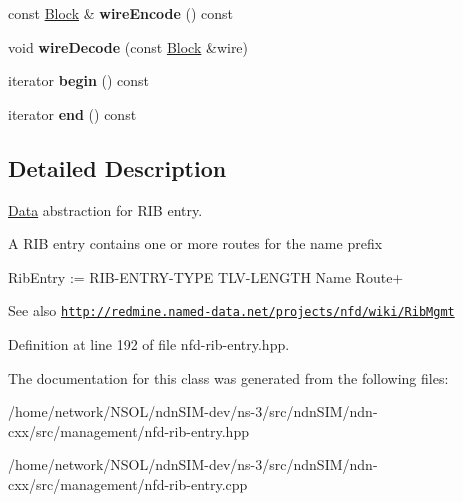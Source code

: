 \begin{DoxyCompactItemize}
\item 
const \hyperlink{classndn_1_1Block}{Block} \& {\bfseries wire\+Encode} () const\hypertarget{classndn_1_1nfd_1_1RibEntry_ae9a113819d406caa92be70ee3f6cfd0d}{}\label{classndn_1_1nfd_1_1RibEntry_ae9a113819d406caa92be70ee3f6cfd0d}

\item 
void {\bfseries wire\+Decode} (const \hyperlink{classndn_1_1Block}{Block} \&wire)\hypertarget{classndn_1_1nfd_1_1RibEntry_a7a621fa190ab527bd4699d81e52bb100}{}\label{classndn_1_1nfd_1_1RibEntry_a7a621fa190ab527bd4699d81e52bb100}

\item 
iterator {\bfseries begin} () const\hypertarget{classndn_1_1nfd_1_1RibEntry_ada9a2987ccbebd98ec88cfecad89064c}{}\label{classndn_1_1nfd_1_1RibEntry_ada9a2987ccbebd98ec88cfecad89064c}

\item 
iterator {\bfseries end} () const\hypertarget{classndn_1_1nfd_1_1RibEntry_a6ee2f83aad4acc89c601218f4d851661}{}\label{classndn_1_1nfd_1_1RibEntry_a6ee2f83aad4acc89c601218f4d851661}

\end{DoxyCompactItemize}


\subsection{Detailed Description}
\hyperlink{classndn_1_1Data}{Data} abstraction for R\+IB entry. 

A R\+IB entry contains one or more routes for the name prefix \begin{DoxyVerb}RibEntry := RIB-ENTRY-TYPE TLV-LENGTH
           Name
           Route+
\end{DoxyVerb}


\begin{DoxySeeAlso}{See also}
\href{http://redmine.named-data.net/projects/nfd/wiki/RibMgmt}{\tt http\+://redmine.\+named-\/data.\+net/projects/nfd/wiki/\+Rib\+Mgmt} 
\end{DoxySeeAlso}


Definition at line 192 of file nfd-\/rib-\/entry.\+hpp.



The documentation for this class was generated from the following files\+:\begin{DoxyCompactItemize}
\item 
/home/network/\+N\+S\+O\+L/ndn\+S\+I\+M-\/dev/ns-\/3/src/ndn\+S\+I\+M/ndn-\/cxx/src/management/nfd-\/rib-\/entry.\+hpp\item 
/home/network/\+N\+S\+O\+L/ndn\+S\+I\+M-\/dev/ns-\/3/src/ndn\+S\+I\+M/ndn-\/cxx/src/management/nfd-\/rib-\/entry.\+cpp\end{DoxyCompactItemize}
